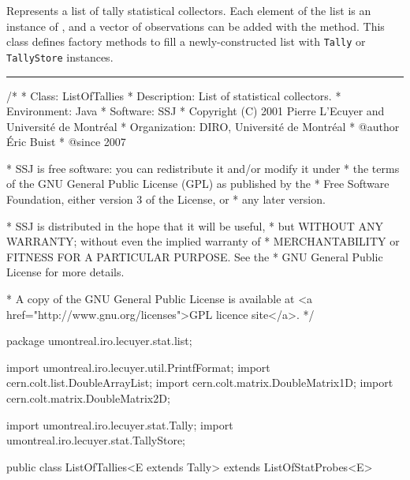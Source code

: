 
Represents a list of tally statistical collectors.
Each element of the list is an instance of ,
and a vector of observations can be added with
the  method.
This class defines factory methods to fill a newly-constructed list
with \texttt{Tally} or \texttt{TallyStore} instances.

\bigskip\hrule

\begin{code}
\begin{hide}
/*
 * Class:        ListOfTallies
 * Description:  List of statistical collectors.
 * Environment:  Java
 * Software:     SSJ 
 * Copyright (C) 2001  Pierre L'Ecuyer and Université de Montréal
 * Organization: DIRO, Université de Montréal
 * @author       Éric Buist 
 * @since        2007

 * SSJ is free software: you can redistribute it and/or modify it under
 * the terms of the GNU General Public License (GPL) as published by the
 * Free Software Foundation, either version 3 of the License, or
 * any later version.

 * SSJ is distributed in the hope that it will be useful,
 * but WITHOUT ANY WARRANTY; without even the implied warranty of
 * MERCHANTABILITY or FITNESS FOR A PARTICULAR PURPOSE.  See the
 * GNU General Public License for more details.

 * A copy of the GNU General Public License is available at
   <a href="http://www.gnu.org/licenses">GPL licence site</a>.
 */
\end{hide}
package umontreal.iro.lecuyer.stat.list;\begin{hide}

import umontreal.iro.lecuyer.util.PrintfFormat;
import cern.colt.list.DoubleArrayList;
import cern.colt.matrix.DoubleMatrix1D;
import cern.colt.matrix.DoubleMatrix2D;

import umontreal.iro.lecuyer.stat.Tally;
import umontreal.iro.lecuyer.stat.TallyStore;
\end{hide}


public class ListOfTallies<E extends Tally> extends ListOfStatProbes<E>\begin{hide} {
\end{hide}
\end{code}
